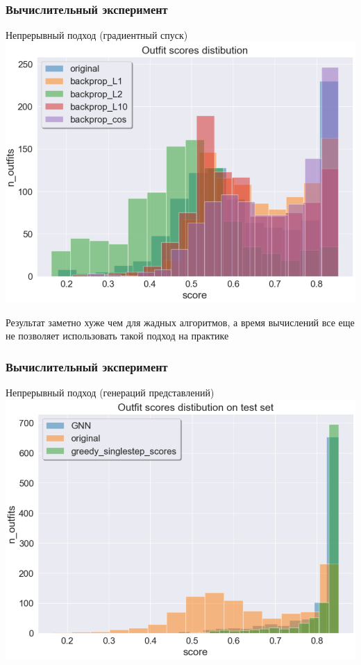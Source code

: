 \documentclass[10pt]{beamer}
\begin{document}
\begin{frame}
	\frametitle{Вычислительный эксперимент}
	\begin{block}{Непрерывный подход (градиентный спуск)}
		\includegraphics[scale = 0.5]{../figures/backprop_at_least_5_subset1000.png}
	\end{block}
Результат заметно хуже чем для жадных алгоритмов, а время вычислений все еще не позволяет использовать такой подход на практике
\end{frame}

\begin{frame}
	\frametitle{Вычислительный эксперимент}
	\begin{block}{Непрерывный подход (генераций представлений)}
		\includegraphics[scale = 0.5]{../figures/GNN_at_least_5_subset1000_test.png}
	\end{block}
\end{frame}
\end{document}
